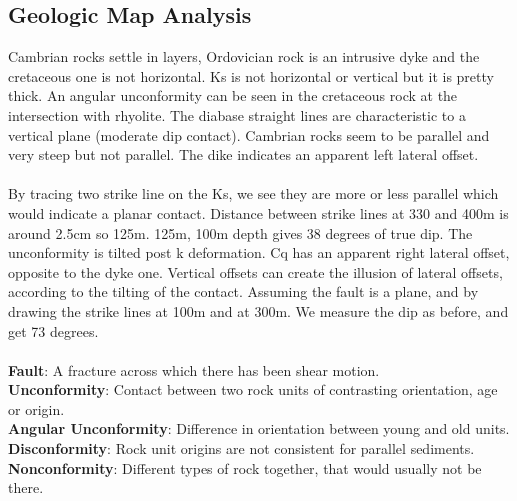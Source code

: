 \documentclass[12pt,a4paper]{report}
\begin{document}
\subsection*{Geologic Map Analysis}
Cambrian rocks settle in layers, Ordovician rock is an intrusive dyke and the cretaceous one is not horizontal.
Ks is not horizontal or vertical but it is pretty thick. An angular unconformity can be seen in the cretaceous rock at the intersection with rhyolite.
The diabase straight lines are characteristic to a vertical plane (moderate dip contact).
Cambrian rocks seem to be parallel and very steep but not parallel.
The dike indicates an apparent left lateral offset.\\
\\
By tracing two strike line on the Ks, we see they are more or less parallel which would indicate a planar contact.
Distance between strike lines at 330 and 400m is around 2.5cm so 125m.
125m, 100m depth gives 38 degrees of true dip.
The unconformity is tilted post k deformation.
Cq has an apparent right lateral offset, opposite to the dyke one.
Vertical offsets can create the illusion of lateral offsets, according to the tilting of the contact.
Assuming the fault is a plane, and by drawing the strike lines at 100m and at 300m.
We measure the dip as before, and get 73 degrees.\\
\\
\textbf{Fault}: A fracture across which there has been shear motion.\\
\textbf{Unconformity}: Contact between two rock units of contrasting orientation, age or origin.\\
\textbf{Angular Unconformity}: Difference in orientation between young and old units.\\
\textbf{Disconformity}: Rock unit origins are not consistent for parallel sediments.\\
\textbf{Nonconformity}: Different types of rock together, that would usually not be there.
\end{document}
